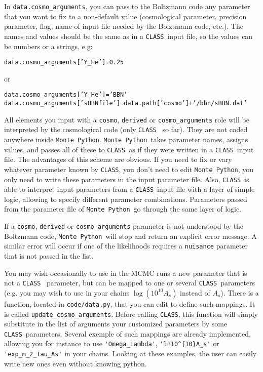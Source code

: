 \documentclass[10pt]{article}
\newcommand{\CLASS}{\texttt{CLASS}}
\newcommand{\MP}{\texttt{Monte Python}}
\begin{document}
  In  \verb?data.cosmo_arguments?, you can pass to the Boltzmann code any parameter that you want to fix to a non-default value (cosmological parameter, precision parameter, flag, name of input file needed by the Bolztmann code, etc.). The names and values should be the same as in a \CLASS~input file, so the values can be numbers or a strings, e.g:
  \begin{alltt}
    data.cosmo_arguments['Y_He']           = 0.25
    \end{alltt}  
    or
  \begin{alltt}
    data.cosmo_arguments['Y_He']           = 'BBN'    
    data.cosmo_arguments['sBBN file'] = data.path['cosmo']+'/bbn/sBBN.dat'
    \end{alltt}
  
  All elements you input with a \verb?cosmo?, \verb?derived? or \verb?cosmo_arguments? role will
  be interpreted by the cosmological code (only \CLASS~ so far). They are not coded anywhere inside \MP. \MP~takes parameter names, assigns values, and passes all of these to \CLASS~as if they were written in a \CLASS~input file. The advantages of this scheme are obvious. If you need to fix or vary whatever parameter known by \CLASS, you don't need to edit \MP, you only need to write these parameters in the input parameter file. Also, \CLASS~is able to interpret input parameters from a \CLASS~input file with a layer of simple logic, allowing to specify different parameter combinations. Parameters passed from the parameter file of \MP~go through the same layer of logic. 
  
  If a \verb?cosmo?, \verb?derived? or \verb?cosmo_arguments? parameter is not understood by the Boltzmann code, \MP~will stop and return an explicit error message. A similar error will occur if one of the likelihoods requires a \verb?nuisance? parameter that is not passed in the list.

  You may wish occasionally to use in the MCMC runs a new parameter that is not a \CLASS~ parameter, but can be mapped to one or several \CLASS~parameters (e.g. you may wish to use in your chains $\log(10^{10}A_s)$ instead of $A_s$). There is a function, located in \verb?code/data.py?, that you can edit to define such mappings. It is called  \verb?update_cosmo_arguments?. Before calling \CLASS, this function will simply substitute in the list of arguments your customized parameters by some \CLASS~parameters. Several exemple of such mappings are already implemented, allowing you for instance to use 
\verb?'Omega_Lambda'?, \verb?'ln10^{10}A_s'? or \verb?'exp_m_2_tau_As'? in your chains. Looking at these examples, the user can easily write new ones even without knowing python.
  
\end{document}
